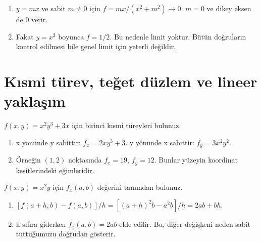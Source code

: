 \begin{tcolorbox}[title={Adım adım çözüm},colback=green!3!white,colframe=green]\begin{enumerate}
\item \(y=mx\) ve sabit \(m\ne0\) için \(f=mx/(x^2+m^2)\to0\). \(m=0\) ve dikey eksen de 0 verir.
\item Fakat \(y=x^2\) boyunca \(f=1/2\). Bu nedenle limit yoktur. Bütün doğruların kontrol edilmesi bile genel limit için yeterli değildir.
\end{enumerate}\end{tcolorbox}
\clearpage\section{Kısmi türev, teğet düzlem ve lineer yaklaşım}
\begin{tcolorbox}[title={Örnek 5.1 | Dersteki temel kısmi türev},colframe=accent]\(f(x,y)=x^2y^3+3x\) için birinci kısmi türevleri bulunuz.
\par{}\end{tcolorbox}
\begin{tcolorbox}[title={Adım adım çözüm},colback=green!3!white,colframe=green]\begin{enumerate}
\item x yönünde y sabittir: \(f_x=2xy^3+3\). y yönünde x sabittir: \(f_y=3x^2y^2\).
\item Örneğin \((1,2)\) noktasında \(f_x=19\), \(f_y=12\). Bunlar yüzeyin koordinat kesitlerindeki eğimleridir.
\end{enumerate}\end{tcolorbox}
\begin{tcolorbox}[title={Örnek 5.2 | Limit tanımıyla kısmi türev},colframe=accent]\(f(x,y)=x^2y\) için \(f_x(a,b)\) değerini tanımdan bulunuz.
\par\vspace{1mm}{\scriptsize\sffamily Pekiştirme}\end{tcolorbox}
\begin{tcolorbox}[title={Adım adım çözüm},colback=green!3!white,colframe=green]\begin{enumerate}
\item \([f(a+h,b)-f(a,b)]/h=[(a+h)^2b-a^2b]/h=2ab+bh\).
\item h sıfıra giderken \(f_x(a,b)=2ab\) elde edilir. Bu, diğer değişkeni neden sabit tuttuğumuzu doğrudan gösterir.
\end{enumerate}\end{tcolorbox}
